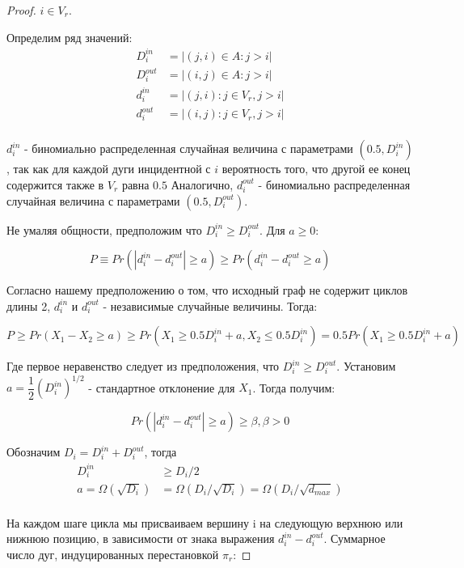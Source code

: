 \begin{proof}
    $i \in V_r$.

    Определим ряд значений:
    \begin{align*}
        D_i^{in} &= |(j, i) \in A: j > i| \\
        D_i^{out} &= |(i, j) \in A: j > i| \\
        d_i^{in} &= |(j, i): j\in V_r, j > i| \\
        d_i^{out} &= |(i, j): j\in V_r, j > i| \\
    \end{align*}

    $d_i^{in}$ - биномиально распределенная случайная величина с параметрами
    $(0.5, D_i^{in})$, так как для каждой дуги инцидентной с $i$ вероятность 
    того, что другой ее конец содержится также в $V_r$ равна $0.5$
    Аналогично, $d_i^{out}$ - биномиально распределенная случайная величина
    с параметрами $(0.5, D_i^{out})$.

    Не умаляя общности, предположим что $D_i^{in} \geq D_i^{out}$. 
    Для $a \geq 0$:

    \[P \equiv Pr(|d_i^{in} - d_i^{out}| \geq a) \geq 
    Pr(d_i^{in} - d_i^{out} \geq a)\]

    Согласно нашему предположению о том, что исходный граф не содержит
    циклов длины 2, $d_i^{in}$ и $d_i^{out}$ - независимые случайные величины.
    Тогда:

    \[
        P \geq Pr(X_1 - X_2 \geq a) \geq
        Pr(X_1 \geq 0.5D_i^{in} + a, X_2 \leq 0.5D_i^{in}) =
        0.5Pr(X_1 \geq 0.5D_i^{in} + a) 
    \]

    Где первое неравенство следует из предположения, что $D_i^{in} \geq 
    D_i^{out}$.
    Установим $a = \dfrac{1}{2}(D_i^{in})^{1/2}$ - стандартное отклонение для 
    $X_1$. Тогда получим:

    \[
        Pr(|d_i^{in} - d_i^{out}| \geq a) \geq \beta, \beta > 0
    \]

    Обозначим $D_i = D_i^{in} + D_i^{out}$, тогда
    \begin{align*}
        D_i^{in} &\geq D_i / 2 \\
        a = \Omega(\sqrt{D_i}) &= \Omega(D_i / \sqrt{D_i}) = \Omega(D_i / 
        \sqrt{d_{max}}) \\
    \end{align*}

    На каждом шаге цикла мы присваиваем вершину i на следующую верхнюю или 
    нижнюю позицию, в зависимости от знака выражения $d_i^{in} - d_i^{out}$.
    Суммарное число дуг, индуцированных перестановкой $\pi_r$:


\end{proof}
